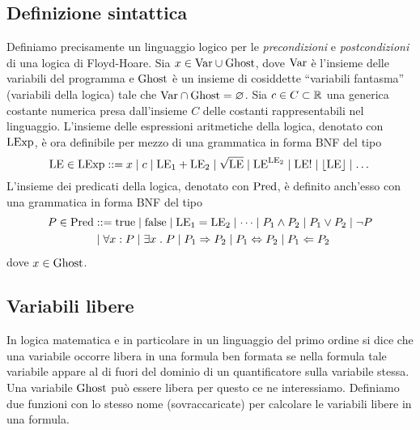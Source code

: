 \subsection{Definizione sintattica}

Definiamo precisamente un linguaggio logico per le
\emph{precondizioni} e \emph{postcondizioni} di una logica di Floyd-Hoare.
Sia $x \in \mathrm{Var} \cup \mathrm{Ghost}$, dove $\mathrm{Var}$ è l'insieme delle variabili del
programma e $\mathrm{Ghost}$ è un insieme di cosiddette ``variabili fantasma''
(variabili della logica) tale che $\mathrm{Var} \cap \mathrm{Ghost} = \varnothing$.
Sia $c \in C \subset \mathbb{R}$ una generica costante numerica presa dall'insieme
$C$ delle costanti rappresentabili nel linguaggio.
L'insieme delle espressioni aritmetiche della logica, denotato con $\mathrm{LExp}$,
è ora definibile per mezzo di una grammatica in forma BNF del tipo
\[
  \mathrm{LE} \in \mathrm{LExp} ::= x
                \mathrel{\mid} c
                \mathrel{\mid} \mathrm{LE}_1 + \mathrm{LE}_2
                \mathrel{\mid} \sqrt{\mathrm{LE}}
                \mathrel{\mid} \mathrm{LE}^{\mathrm{LE}_2}
                \mathrel{\mid} \mathrm{LE}!
                \mathrel{\mid} \lfloor \mathrm{LE} \rfloor
                \mathrel{\mid} \dots
\]
L'insieme dei predicati della logica, denotato con $\mathrm{Pred}$, è definito anch'esso con una grammatica in forma BNF del tipo
\begin{align*}
P \in \Pred &::= \true
            \vbar \false
            \vbar\LE_1 = \LE_2
            \vbar \dots
            \vbar P_1 \land P_2
            \vbar P_1 \lor P_2
            \vbar \neg P \\
            &\vbar \forall x \itc P
            \vbar \exists x \st P
            \vbar P_1 \Rightarrow P_2
            \vbar P_1 \Leftrightarrow P_2 \vbar P_1 \Leftarrow P_2
\end{align*}
dove $x \in\mathrm{Ghost}$.

\subsection{Variabili libere}
In logica matematica e in particolare in un linguaggio del primo ordine si dice che una variabile occorre libera in una formula ben formata se nella formula tale variabile appare al di fuori del dominio di un quantificatore sulla variabile stessa. Una variabile $\mathrm{Ghost}$ può essere libera per questo ce ne interessiamo.
Definiamo due funzioni con lo stesso nome (sovraccaricate) per calcolare le variabili libere in una formula.

